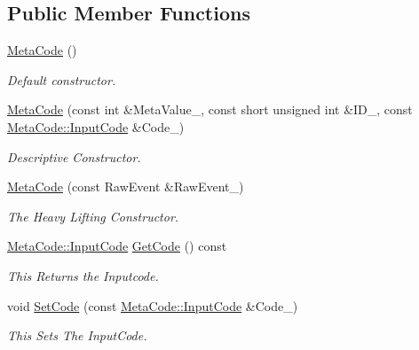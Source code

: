 \subsection*{Public Member Functions}
\begin{DoxyCompactItemize}
\item 
\hyperlink{classphys_1_1MetaCode_ae2c80c84f924ddfd880f46ffe6a1746e}{MetaCode} ()
\begin{DoxyCompactList}\small\item\em Default constructor. \item\end{DoxyCompactList}\item 
\hyperlink{classphys_1_1MetaCode_a05bcc50a09a9a5d19520dc258841f117}{MetaCode} (const int \&MetaValue\_\-, const short unsigned int \&ID\_\-, const \hyperlink{classphys_1_1MetaCode_a3e501cbb5bf0f6f1fdb7211465bda8d8}{MetaCode::InputCode} \&Code\_\-)
\begin{DoxyCompactList}\small\item\em Descriptive Constructor. \item\end{DoxyCompactList}\item 
\hyperlink{classphys_1_1MetaCode_ad9a618b5cc6f9d0cf0a4bc4f47bf98e8}{MetaCode} (const RawEvent \&RawEvent\_\-)
\begin{DoxyCompactList}\small\item\em The Heavy Lifting Constructor. \item\end{DoxyCompactList}\item 
\hyperlink{classphys_1_1MetaCode_a3e501cbb5bf0f6f1fdb7211465bda8d8}{MetaCode::InputCode} \hyperlink{classphys_1_1MetaCode_a5835a05391cbb5a3dc83534a7bcf87d3}{GetCode} () const 
\begin{DoxyCompactList}\small\item\em This Returns the Inputcode. \item\end{DoxyCompactList}\item 
void \hyperlink{classphys_1_1MetaCode_ab6759fbee9d039cf248bf76dde0f33dd}{SetCode} (const \hyperlink{classphys_1_1MetaCode_a3e501cbb5bf0f6f1fdb7211465bda8d8}{MetaCode::InputCode} \&Code\_\-)
\begin{DoxyCompactList}\small\item\em This Sets The InputCode. \item\end{DoxyCompactList}\item 

\end{DoxyCompactItemize}

